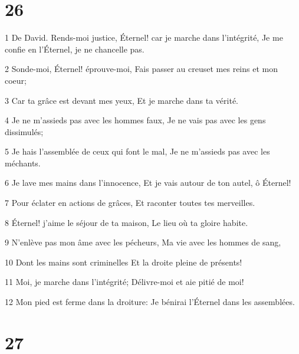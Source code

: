 \chapter{26}

\par 1 De David. Rends-moi justice, Éternel! car je marche dans l'intégrité, Je me confie en l'Éternel, je ne chancelle pas.
\par 2 Sonde-moi, Éternel! éprouve-moi, Fais passer au creuset mes reins et mon coeur;
\par 3 Car ta grâce est devant mes yeux, Et je marche dans ta vérité.
\par 4 Je ne m'assieds pas avec les hommes faux, Je ne vais pas avec les gens dissimulés;
\par 5 Je hais l'assemblée de ceux qui font le mal, Je ne m'assieds pas avec les méchants.
\par 6 Je lave mes mains dans l'innocence, Et je vais autour de ton autel, ô Éternel!
\par 7 Pour éclater en actions de grâces, Et raconter toutes tes merveilles.
\par 8 Éternel! j'aime le séjour de ta maison, Le lieu où ta gloire habite.
\par 9 N'enlève pas mon âme avec les pécheurs, Ma vie avec les hommes de sang,
\par 10 Dont les mains sont criminelles Et la droite pleine de présents!
\par 11 Moi, je marche dans l'intégrité; Délivre-moi et aie pitié de moi!
\par 12 Mon pied est ferme dans la droiture: Je bénirai l'Éternel dans les assemblées.

\chapter{27}

